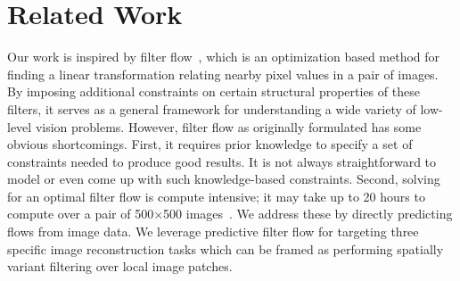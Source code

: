 \documentclass[10pt,twocolumn,letterpaper]{article}
\newcommand\TODO[1]{\textcolor{red}{\bf [[#1]]}}
\begin{document}



\section{Related Work}

Our work is inspired by filter flow~\cite{seitz2009filter}, which is an
optimization based method for finding a linear transformation relating nearby
pixel values in a pair of images.  By imposing additional constraints on
certain structural properties of these filters, it serves as a general
framework for understanding a wide variety of low-level vision problems.
However, filter flow as originally formulated has some obvious shortcomings.
First, it requires prior knowledge to specify a set of constraints needed to
produce good results.  It is not always straightforward to model or even come
up with such knowledge-based constraints.  Second, solving for an optimal
filter flow is compute intensive; it may take up to 20 hours to compute over a
pair of 500$\times$500 images~\cite{seitz2009filter}.  We address these by
directly predicting flows from image data.  We leverage predictive filter flow
for targeting three specific image reconstruction tasks which can be framed as
performing spatially variant filtering over local image patches.

%
\end{document}
